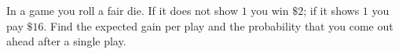 In a game you roll a fair die. If it does not show $1$ you win $\$2$; if it shows $1$ you pay $\$16$. Find the expected gain per play and the probability that you come out ahead after a single play.
